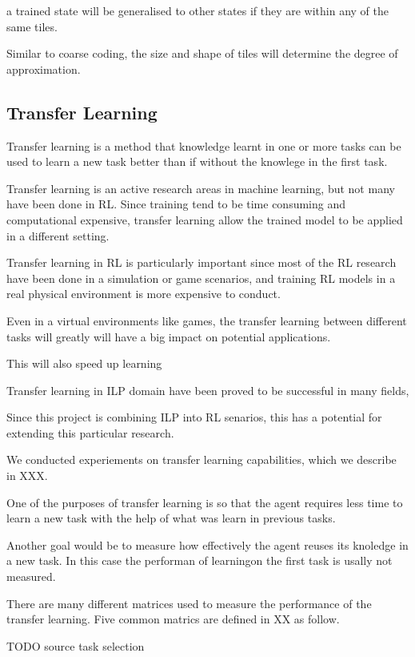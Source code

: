 \documentclass[12pt,twoside]{report}
\theoremstyle{plain}
\theoremstyle{definition}
\begin{document}
a trained state will be generalised to other states if they are within any of the same tiles. 

Similar to coarse coding, the size and shape of tiles will determine the degree of approximation. 

\subsection{Transfer Learning}
\label{transfer_learning}

Transfer learning is a method that knowledge learnt in one or more tasks can be used to learn a new task better than if without the knowlege in the first task. 

Transfer learning is an active research areas in machine learning, but not many have been done in RL. 
Since training tend to be time consuming and computational expensive, transfer learning allow the trained model to be applied in a different setting. 

Transfer learning in RL is particularly important since most of the RL research have been done in a simulation or game scenarios, and training RL models in a real physical environment is more expensive to conduct. 

Even in a virtual environments like games,  the transfer learning between different tasks will greatly will have a big impact on potential applications. 

This will also speed up learning 

Transfer learning in ILP domain have been proved to be successful in many fields, 

Since this project is combining ILP into RL senarios, this has a potential for extending this particular research. 

We conducted experiements on transfer learning capabilities, which we describe in XXX. 

One of the  purposes of transfer learning is so that the agent requires less time to learn a new task with the help of what was learn in previous tasks.  


Another goal would be to measure how effectively the agent reuses its knoledge in a new task. 
In this case the performan of learningon the first task is usally not measured. 

There are many different matrices used to measure the performance of the transfer learning.
Five common matrics are defined in XX as follow.


TODO source task selection
\end{document}
